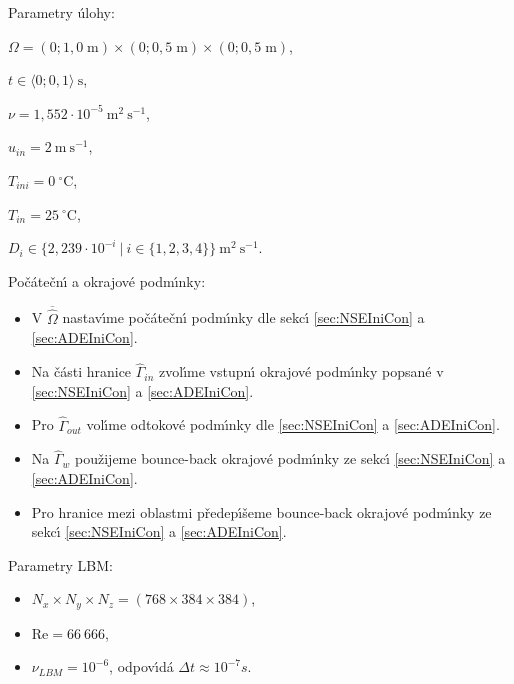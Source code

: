         \begin{tcolorbox}[colframe=blue, title = \'{U}loha \ref{sub:Prob01}]
                            
            Parametry \'{u}lohy:
            \begin{itemize}
                \begin{multicols}{2}
                \item $\Omega = (0;1{,}0 \; \mathrm{m}) \times (0;0{,}5 \; \mathrm{m}) \times (0;0{,}5 \; \mathrm{m})$,
                \item $t \in \langle 0;0{,}1 \rangle \ \mathrm{s}$,
                \item $\nu = 1{,}552 \cdot 10^{-5} \ \mathrm{m^2 \ s^{-1}}$,
                \item $u_{in} = 2 \ \mathrm{m \ s^{-1}}$,
                \item $T_{ini} = 0 \ ^{\circ}\mathrm{C}$,
                \item $T_{in} = 25 \ ^{\circ}\mathrm{C}$,
                \item $D_{i} \in \{ 2{,}239 \cdot 10^{-i} \ | \ i \in \{ 1, 2, 3, 4\}\} \ \mathrm{m}^2 \ \mathrm{s}^{-1}$.
                \end{multicols}
            \end{itemize}
            
            Po\v{c}\'{a}te\v{c}n\'{\i} a okrajov\'{e} podm\'{\i}nky:
            \begin{itemize}
                \item V $\overline{\hat{\Omega}}$ nastav\'{\i}me po\v{c}\'{a}te\v{c}n\'{\i} podm\'{\i}nky dle sekc\'{\i} \ref{sec:NSEIniCon} a \ref{sec:ADEIniCon}.
                \item Na \v{c}\'{a}sti hranice $\hat{\Gamma}_{in}$ zvol\'{\i}me vstupn\'{\i} okrajov\'{e} podm\'{\i}nky popsan\'{e} v \ref{sec:NSEIniCon} a \ref{sec:ADEIniCon}.
                \item Pro $\hat{\Gamma}_{out}$ vol\'{\i}me odtokov\'{e} podm\'{\i}nky dle \ref{sec:NSEIniCon} a \ref{sec:ADEIniCon}.
                \item Na $\hat{\Gamma}_{w}$ pou\v{z}ijeme bounce-back okrajov\'{e} podm\'{\i}nky ze sekc\'{\i} \ref{sec:NSEIniCon} a \ref{sec:ADEIniCon}.
                \item Pro hranice mezi oblastmi p\v{r}edep\'{\i}\v{s}eme bounce-back okrajov\'{e} podm\'{\i}nky ze sekc\'{\i} \ref{sec:NSEIniCon} a \ref{sec:ADEIniCon}.
            \end{itemize}
            
            


            Parametry LBM:
            \begin{itemize}
                \item $N_x \times N_y \times N_z = (768 \times 384 \times 384)$,
                \item $\mathrm{Re} = 66 \ 666$,
                \item $\nu_{LBM} = 10^{-6}$, odpov\'{\i}d\'{a} $\Delta t \approx 10^{-7} s$.
            \end{itemize}

        \end{tcolorbox}

